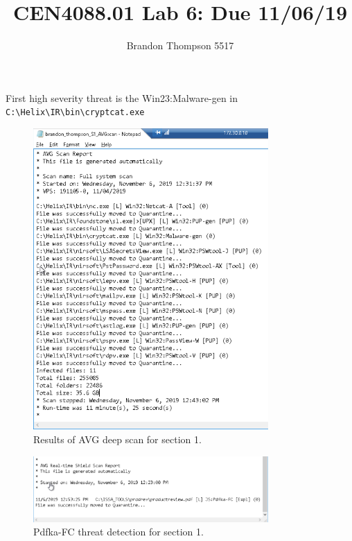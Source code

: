 \documentclass[a4paper]{article}
\begin{document}
	\title{CEN4088.01 Lab 6: Due 11/06/19}
	\author{Brandon Thompson 5517}
	\maketitle

	First high severity threat is the Win23:Malware-gen in \verb|C:\Helix\IR\bin\cryptcat.exe|\\
	\begin{figure}[ht!]
		\centering
		\includegraphics[width=0.8\textwidth]{1_1_26}
		\caption{Results of AVG deep scan for section 1.}
		\label{fig:1_1_26}
	\end{figure}

	\begin{figure}[ht!]
		\centering
		\includegraphics[width=0.8\textwidth]{1_2_11}
		\caption{Pdfka-FC threat detection for section 1.}
		\label{fig:1_2_11}
	\end{figure}
\end{document}
